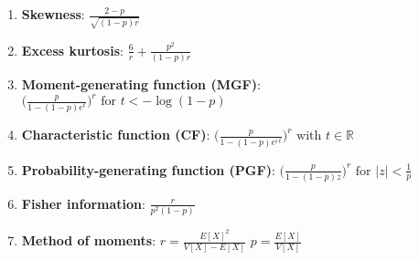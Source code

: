 \begin{enumerate}
    \item \textbf{Skewness}:
    $
         {\displaystyle {\frac {2-p}{\sqrt {(1-p)r}}}}
    $
    \hfill \cite{wiki/Negative_binomial_distribution}

    \item \textbf{Excess kurtosis}: 
    $
         {\displaystyle {\frac {6}{r}}+{\frac {p^{2}}{(1-p)r}}}
    $
    \hfill \cite{wiki/Negative_binomial_distribution}


    \item \textbf{Moment-generating function (MGF)}: 
    $
         {\displaystyle {\biggl (}{\frac {p}{1-(1-p)e^{t}}}{\biggr )}^{\!r}{\text{ for }}t<-\log(1-p)}
    $
    \hfill \cite{wiki/Negative_binomial_distribution}
    
    \item \textbf{Characteristic function (CF)}:
    $   
         {\displaystyle {\biggl (}{\frac {p}{1-(1-p)e^{i\,t}}}{\biggr )}^{\!r}{\text{ with }}t\in \mathbb {R} }
    $
    \hfill \cite{wiki/Negative_binomial_distribution}

    \item \textbf{Probability-generating function (PGF)}:
    $
         {\displaystyle {\biggl (}{\frac {p}{1-(1-p)z}}{\biggr )}^{\!r}{\text{ for }}|z|<{\frac {1}{p}}}
    $
    \hfill \cite{wiki/Negative_binomial_distribution}

    \item \textbf{Fisher information}:
    $
         {\displaystyle {\frac {r}{p^{2}(1-p)}}}
    $
    \hfill \cite{wiki/Negative_binomial_distribution}

    \item \textbf{Method of moments}:
    $ {\displaystyle r={\frac {E[X]^{2}}{V[X]-E[X]}}}$
    \hspace{1cm}
    $ {\displaystyle p={\frac {E[X]}{V[X]}}}$
    \hfill \cite{wiki/Negative_binomial_distribution}
\end{enumerate}







